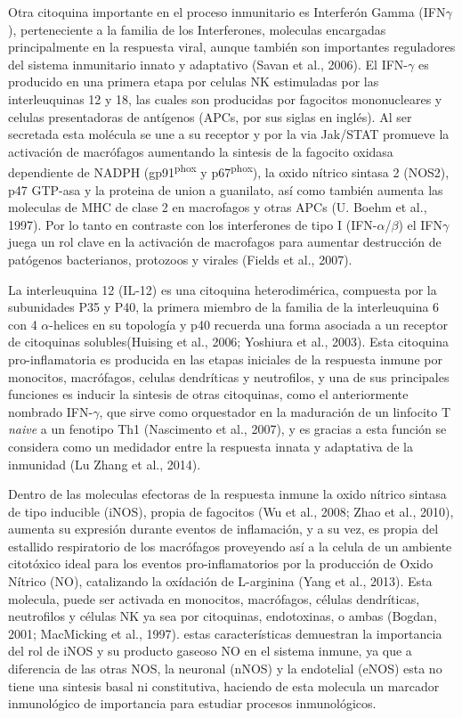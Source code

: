 \documentclass[12pt,a4paper,oneside]{scrbook}
\begin{document}
Otra citoquina importante en el proceso inmunitario es Interferón Gamma
(IFN$\gamma$), perteneciente a la familia de los Interferones, moleculas
encargadas principalmente en la respuesta viral, aunque también son
importantes reguladores del sistema inmunitario innato y adaptativo
(Savan et al., 2006). El IFN-$\gamma$ es producido en una primera etapa
por celulas NK estimuladas por las interleuquinas 12 y 18, las cuales
son producidas por fagocitos mononucleares y celulas presentadoras de
antígenos (APCs, por sus siglas en inglés). Al ser secretada esta
molécula se une a su receptor y por la via Jak/STAT promueve la
activación de macrófagos aumentando la sintesis de la fagocito oxidasa
dependiente de NADPH (\si{gp91^{phox}} y \si{p67^{phox}}), la oxido
nítrico sintasa 2 (NOS2), p47 GTP-asa y la proteina de union a
guanilato, así como también aumenta las moleculas de MHC de clase 2 en
macrofagos y otras APCs (U. Boehm et al., 1997). Por lo tanto en
contraste con los interferones de tipo I (IFN-$\alpha$/$\beta$) el
IFN$\gamma$ juega un rol clave en la activación de macrofagos para
aumentar destrucción de patógenos bacterianos, protozoos y virales
(Fields et al., 2007).

La interleuquina 12 (IL-12) es una citoquina heterodimérica, compuesta
por la subunidades P35 y P40, la primera miembro de la familia de la
interleuquina 6 con 4 $\alpha$-helices en su topología y p40 recuerda
una forma asociada a un receptor de citoquinas solubles(Huising et al.,
2006; Yoshiura et al., 2003). Esta citoquina pro-inflamatoria es
producida en las etapas iniciales de la respuesta inmune por monocitos,
macrófagos, celulas dendríticas y neutrofilos, y una de sus principales
funciones es inducir la sintesis de otras citoquinas, como el
anteriormente nombrado IFN-$\gamma$, que sirve como orquestador en la
maduración de un linfocito T \emph{naive} a un fenotipo Th1 (Nascimento
et al., 2007), y es gracias a esta función se considera como un
medidador entre la respuesta innata y adaptativa de la inmunidad (Lu
Zhang et al., 2014).

Dentro de las moleculas efectoras de la respuesta inmune la oxido
nítrico sintasa de tipo inducible (iNOS), propia de fagocitos (Wu et
al., 2008; Zhao et al., 2010), aumenta su expresión durante eventos de
inflamación, y a su vez, es propia del estallido respiratorio de los
macrófagos proveyendo así a la celula de un ambiente citotóxico ideal
para los eventos pro-inflamatorios por la producción de Oxido Nítrico
(NO), catalizando la oxídación de L-arginina (Yang et al., 2013). Esta
molecula, puede ser activada en monocitos, macrófagos, células
dendríticas, neutrofilos y células NK ya sea por citoquinas,
endotoxinas, o ambas (Bogdan, 2001; MacMicking et al., 1997). estas
características demuestran la importancia del rol de iNOS y su producto
gaseoso NO en el sistema inmune, ya que a diferencia de las otras NOS,
la neuronal (nNOS) y la endotelial (eNOS) esta no tiene una sintesis
basal ni constitutiva, haciendo de esta molecula un marcador
inmunológico de importancia para estudiar procesos inmunológicos.
\end{document}
